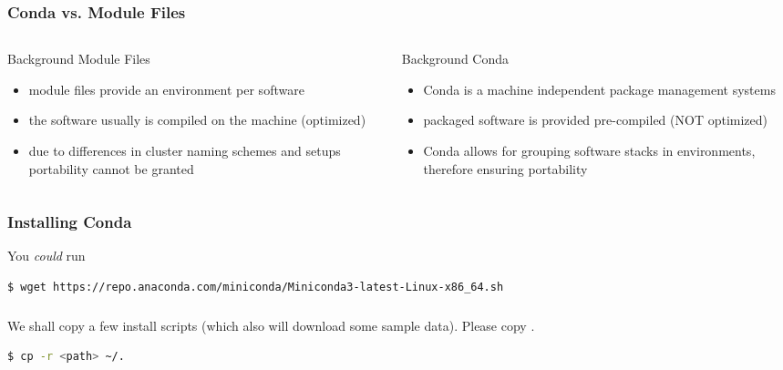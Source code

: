 \begin{frame}
  \frametitle{Conda vs. Module Files}
  \begin{columns}
    \begin{column}{0.5\textwidth}
      Background Module Files
      \begin{itemize}
       \item module files provide an environment per software
       \item the software usually is compiled on the machine (optimized)
       \item due to differences in cluster naming schemes and setups portability cannot be granted
      \end{itemize}
    \end{column}
    \begin{column}{0.5\textwidth}
      Background Conda
      \begin{itemize}
       \item Conda is a machine independent package management systems
       \item packaged software is provided pre-compiled (NOT optimized)
       \item Conda allows for grouping software stacks in environments, therefore ensuring portability
      \end{itemize}
    \end{column}
  \end{columns}
\end{frame}


\begin{frame}[fragile]
  \frametitle{Installing Conda}
  You \emph{could} run
  \begin{lstlisting}[language=Bash, style=Shell, basicstyle=\small,breaklines=true ]
$ wget https://repo.anaconda.com/miniconda/Miniconda3-latest-Linux-x86_64.sh
  \end{lstlisting}
  \pause
\end{frame} 

\begin{frame}[fragile]
  \frametitle{}
  We shall copy a few install scripts (which also will download some sample data).\newline
  Please copy \pathtoexercise.
  \begin{lstlisting}[language=Bash, style=Shell]
$ cp -r <path> ~/.
  \end{lstlisting}
\end{frame}


